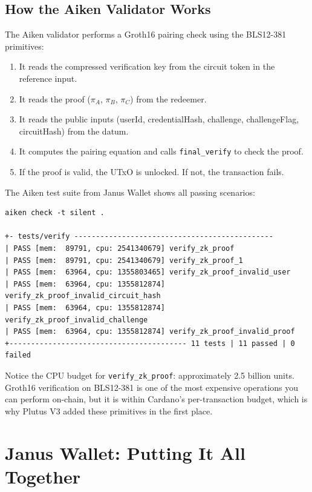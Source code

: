 \subsection*{How the Aiken Validator Works}

The Aiken validator performs a Groth16 pairing check using the BLS12-381 primitives:

\begin{enumerate}
  \item It reads the compressed verification key from the circuit token in the reference input.
  \item It reads the proof ($\pi_A$, $\pi_B$, $\pi_C$) from the redeemer.
  \item It reads the public inputs (userId, credentialHash, challenge, challengeFlag, circuitHash) from the datum.
  \item It computes the pairing equation and calls \texttt{final\_verify} to check the proof.
  \item If the proof is valid, the UTxO is unlocked. If not, the transaction fails.
\end{enumerate}

The Aiken test suite from Janus Wallet shows all passing scenarios:

\begin{verbatim}
aiken check -t silent .

+- tests/verify ----------------------------------------------
| PASS [mem:  89791, cpu: 2541340679] verify_zk_proof
| PASS [mem:  89791, cpu: 2541340679] verify_zk_proof_1
| PASS [mem:  63964, cpu: 1355803465] verify_zk_proof_invalid_user
| PASS [mem:  63964, cpu: 1355812874] verify_zk_proof_invalid_circuit_hash
| PASS [mem:  63964, cpu: 1355812874] verify_zk_proof_invalid_challenge
| PASS [mem:  63964, cpu: 1355812874] verify_zk_proof_invalid_proof
+----------------------------------------- 11 tests | 11 passed | 0 failed
\end{verbatim}

Notice the CPU budget for \texttt{verify\_zk\_proof}: approximately 2.5 billion units. Groth16 verification on BLS12-381 is one of the most expensive operations you can perform on-chain, but it is within Cardano's per-transaction budget, which is why Plutus V3 added these primitives in the first place.

\section{Janus Wallet: Putting It All Together} \label{sec:janus}

